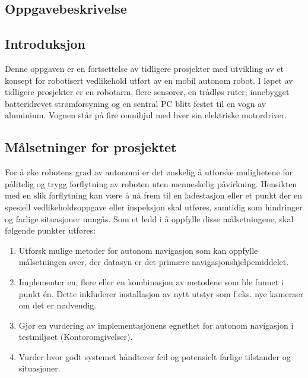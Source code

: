 \begin{multicols}{2}

\section*{Oppgavebeskrivelse}

\subsection*{Introduksjon}

Denne oppgaven er en fortsettelse av tidligere prosjekter med utvikling av et konsept for robotisert vedlikehold utført av en mobil autonom robot. I løpet av tidligere prosjekter er en robotarm, flere sensorer, en trådløs ruter, innebygget batteridrevet strømforsyning og en sentral PC blitt festet til en vogn av aluminium. Vognen står på fire omnihjul med hver sin elektriske motordriver.

\subsection*{Målsetninger for prosjektet}

For å øke robotens grad av autonomi er det ønskelig å utforske mulighetene for pålitelig og trygg forflytning av roboten uten menneskelig påvirkning. Hensikten med en slik forflytning kan være å nå frem til en ladestasjon eller et punkt der en spesiell vedlikeholdsoppgave eller inspeksjon skal utføres, samtidig som hindringer og farlige situasjoner unngås. Som et ledd i å oppfylle disse målsetningene, skal følgende punkter utføres: 

\begin{enumerate}
	\item Utforsk mulige metoder for autonom navigasjon som kan oppfylle målsetningen over, der datasyn er det primære navigasjonshjelpemiddelet.
	
	\item Implementer en, flere eller en kombinasjon av metodene som ble funnet i punkt én. Dette inkluderer installasjon av nytt utstyr som f.eks. nye kameraer om det er nødvendig.
	
	\item Gjør en vurdering av implementasjonens egnethet for autonom navigasjon i testmiljøet (Kontoromgivelser).
	
	\item Vurder hvor godt systemet håndterer feil og potensielt farlige tilstander og situasjoner.
	

\end{enumerate}
\end{multicols}
